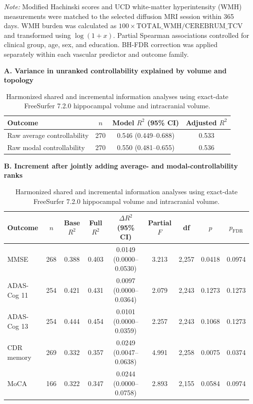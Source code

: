 \documentclass{article}
\begin{document}
\begin{table}[!htbp]
\vspace{1mm}
\footnotesize{\textit{Note:} Modified Hachinski scores and UCD
white-matter hyperintensity (WMH) measurements were matched to the
selected diffusion MRI session within 365 days. WMH burden was calculated
as \(100\times\mathrm{TOTAL\_WMH}/\mathrm{CEREBRUM\_TCV}\) and transformed
using \(\log(1+x)\). Partial Spearman associations controlled for clinical
group, age, sex, and education. BH-FDR correction was applied separately
within each vascular predictor and outcome family. }
\end{table}

\begin{table}[!htbp]
\centering
\caption{Harmonized shared and incremental information analyses using exact-date FreeSurfer 7.2.0 hippocampal volume and intracranial volume.}
\label{tab:tableS6}
\scriptsize

\textbf{A. Variance in unranked controllability explained by volume and topology}

\vspace{1mm}
\begin{tabular}{@{}lccc@{}}
\toprule
\textbf{Outcome} & \textbf{$n$} & \textbf{Model $R^2$ (95\% CI)} & \textbf{Adjusted $R^2$}\\
\midrule
Raw average controllability & 270 & 0.546 (0.449--0.688) & 0.533 \\
Raw modal controllability   & 270 & 0.550 (0.481--0.655) & 0.536 \\
\bottomrule
\end{tabular}

\vspace{3mm}
\textbf{B. Increment after jointly adding average- and modal-controllability ranks}

\vspace{1mm}
\scriptsize
\setlength{\tabcolsep}{3pt}
\begin{tabular}{@{}lcccccccc@{}}
\toprule
\textbf{Outcome} &
\textbf{$n$} &
\textbf{Base $R^2$} &
\textbf{Full $R^2$} &
\textbf{$\Delta R^2$ (95\% CI)} &
\textbf{Partial $F$} &
\textbf{df} &
\textbf{$p$} &
\textbf{$p_{\mathrm{FDR}}$}\\
\midrule
MMSE        & 268 & 0.388 & 0.403 & 0.0149 (0.0000--0.0530) & 3.213 & 2,257 & 0.0418 & 0.0974 \\
ADAS-Cog 11 & 254 & 0.421 & 0.431 & 0.0097 (0.0000--0.0364) & 2.079 & 2,243 & 0.1273 & 0.1273 \\
ADAS-Cog 13 & 254 & 0.444 & 0.454 & 0.0101 (0.0000--0.0359) & 2.257 & 2,243 & 0.1068 & 0.1273 \\
CDR memory  & 269 & 0.332 & 0.357 & 0.0249 (0.0047--0.0638) & 4.991 & 2,258 & 0.0075 & 0.0374 \\
MoCA        & 166 & 0.322 & 0.347 & 0.0244 (0.0000--0.0758) & 2.893 & 2,155 & 0.0584 & 0.0974 \\
\bottomrule
\end{tabular}


\end{table}
\end{document}
